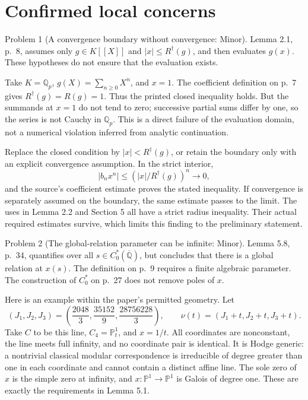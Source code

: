 \documentclass[10pt]{article}
\begin{document}
\section*{Confirmed local concerns}
Problem 1 (A convergence boundary without convergence: Minor).  Lemma 2.1, p. 8, assumes only \(g\in K[[X]]\) and \(|x|\leq R^\dagger(g)\), and then evaluates \(g(x)\). These hypotheses do not ensure that the evaluation exists.\par
Take \(K=\mathbb Q_p\), \(g(X)=\sum_{n\geq0}X^n\), and \(x=1\). The coefficient definition on p. 7 gives \(R^\dagger(g)=R(g)=1\). Thus the printed closed inequality holds. But the summands at \(x=1\) do not tend to zero; successive partial sums differ by one, so the series is not Cauchy in \(\mathbb Q_p\). This is a direct failure of the evaluation domain, not a numerical violation inferred from analytic continuation.\par
Replace the closed condition by \(|x|<R^\dagger(g)\), or retain the boundary only with an explicit convergence assumption. In the strict interior, \[|b_nx^n|\leq (|x|/R^\dagger(g))^n\longrightarrow0,\] and the source’s coefficient estimate proves the stated inequality. If convergence is separately assumed on the boundary, the same estimate passes to the limit. The uses in Lemma 2.2 and Section 5 all have a strict radius inequality. Their actual required estimates survive, which limits this finding to the preliminary statement.\par
Problem 2 (The global-relation parameter can be infinite: Minor).  Lemma 5.8, p. 34, quantifies over all \(s\in C_0^*(\overline{\mathbb Q})\), but concludes that there is a global relation at \(x(s)\). The definition on p. 9 requires a finite algebraic parameter. The construction of \(C_0^*\) on p. 27 does not remove poles of \(x\).\par
Here is an example within the paper’s permitted geometry. Let \[(J_1,J_2,J_3)=
 \left(\frac{2048}{3},\frac{35152}{9},
                       \frac{28756228}{3}\right),\qquad
 \nu(t)=(J_1+t,J_2+t,J_3+t).\] Take \(C\) to be this line, \(C_4=\mathbb P^1_t\), and \(x=1/t\). All coordinates are nonconstant, the line meets full infinity, and no coordinate pair is identical. It is Hodge generic: a nontrivial classical modular correspondence is irreducible of degree greater than one in each coordinate and cannot contain a distinct affine line. The sole zero of \(x\) is the simple zero at infinity, and \(x:\mathbb P^1\to\mathbb P^1\) is Galois of degree one. These are exactly the requirements in Lemma 5.1.\par
\end{document}
